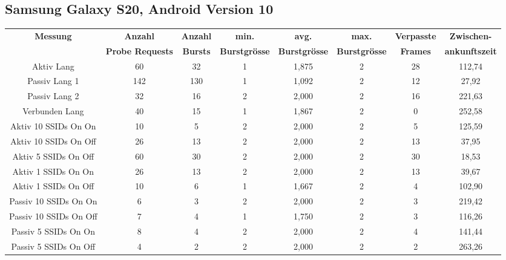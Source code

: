 \begin{landscape}
   \subsection*{Samsung Galaxy S20, Android Version 10}
   \begin{table}[h!]
      \small
      \centering
      \begin{tabular}{|c|c|c|c|c|c|c|c|}
      \hline
      \textbf{Messung} & \textbf{Anzahl} & \textbf{Anzahl} & \textbf{min.} & \textbf{avg.} & \textbf{max.} & \textbf{Verpasste} & \textbf{Zwischen-}\\
      & \textbf{Probe Requests} & \textbf{Bursts} & \textbf{Burstgrösse} & \textbf{Burstgrösse} & \textbf{Burstgrösse} & \textbf{Frames} & \textbf{ankunftszeit}\\
      \hline
      Aktiv Lang & \phantom{0}60 & \phantom{0}32 & 1 & 1,875 & 2 & \phantom{0}28 & 112,74 \\
      Passiv Lang 1 & 142 & 130 & 1 & 1,092 & 2 & \phantom{0}12 & \phantom{0}27,92 \\
      Passiv Lang 2 & \phantom{0}32 & \phantom{0}16 & 2 & 2,000 & 2 & \phantom{0}16 & 221,63 \\
      Verbunden Lang & \phantom{0}40 & \phantom{0}15 & 1 & 1,867 & 2 & \phantom{00}0 & 252,58 \\
      Aktiv 10 SSIDs On On & \phantom{0}10 & \phantom{00}5 & 2 & 2,000 & 2 & \phantom{00}5 & 125,59 \\
      Aktiv 10 SSIDs On Off & \phantom{0}26 & \phantom{0}13 & 2 & 2,000 & 2 & \phantom{0}13 & \phantom{0}37,95 \\
      Aktiv 5 SSIDs On Off & \phantom{0}60 & \phantom{0}30 & 2 & 2,000 & 2 & \phantom{0}30 & \phantom{0}18,53 \\
      Aktiv 1 SSIDs On On & \phantom{0}26 & \phantom{0}13 & 2 & 2,000 & 2 & \phantom{0}13 & \phantom{0}39,67 \\
      Aktiv 1 SSIDs On Off & \phantom{0}10 & \phantom{00}6 & 1 & 1,667 & 2 & \phantom{00}4 & 102,90 \\
      Passiv 10 SSIDs On On & \phantom{00}6 & \phantom{00}3 & 2 & 2,000 & 2 & \phantom{00}3 & 219,42 \\
      Passiv 10 SSIDs On Off & \phantom{00}7 & \phantom{00}4 & 1 & 1,750 & 2 & \phantom{00}3 & 116,26 \\
      Passiv 5 SSIDs On On & \phantom{00}8 & \phantom{00}4 & 2 & 2,000 & 2 & \phantom{00}4 & 141,44 \\
      Passiv 5 SSIDs On Off & \phantom{00}4 & \phantom{00}2 & 2 & 2,000 & 2 & \phantom{00}2 & 263,26 \\

\end{tabular}
\end{table}
\end{landscape}
